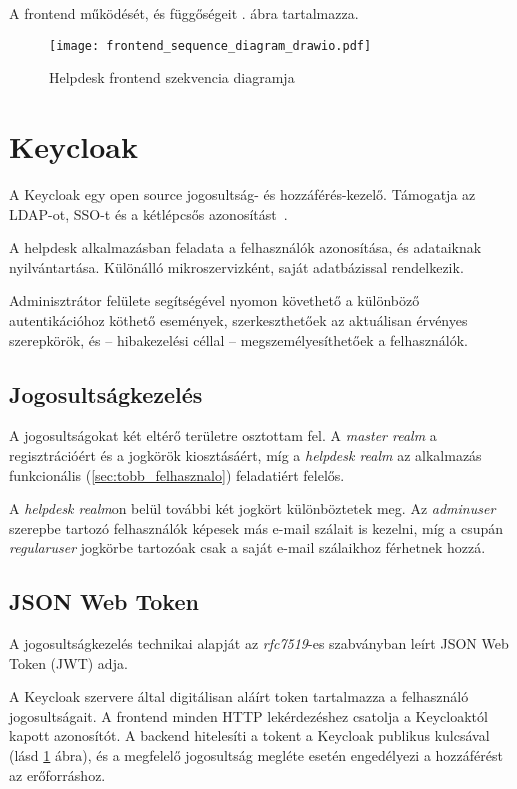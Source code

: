 A frontend működését, és függőségeit . ábra tartalmazza.

\begin{figure}[hbp] 
	\centering
	\texttt{[image: frontend\_sequence\_diagram\_drawio.pdf]}
	\caption{Helpdesk frontend szekvencia diagramja}
	\label{fig:frontend_sequence_diagram}
\end{figure}


\section{Keycloak}\label{sec:keycloak}
A Keycloak egy open source jogosultság- és hozzáférés-kezelő. Támogatja az LDAP-ot, SSO-t és a kétlépcsős azonosítást~\cite{Keycloak_website}. 

A helpdesk alkalmazásban feladata a felhasználók azonosítása, és adataiknak nyilvántartása. Különálló mikroszervizként, saját adatbázissal rendelkezik.

Adminisztrátor felülete segítségével nyomon követhető a különböző autentikációhoz köthető események, szerkeszthetőek az aktuálisan érvényes szerepkörök, és --  hibakezelési céllal --   megszemélyesíthetőek a felhasználók.


\subsection{Jogosultságkezelés}
A jogosultságokat két eltérő területre osztottam fel. A \textit{master realm} a regisztrációért és a jogkörök kiosztásáért, míg a \textit{helpdesk realm} az alkalmazás funkcionális (\ref{sec:tobb_felhasznalo}) feladatiért felelős.

A \textit{helpdesk realm}on belül további két jogkört különböztetek meg. Az \textit{admin\textunderscore user} szerepbe tartozó felhasználók képesek más e-mail szálait is kezelni, míg a csupán \textit{regular\textunderscore user} jogkörbe tartozóak csak a saját e-mail szálaikhoz férhetnek hozzá.


\subsection{JSON Web Token}\label{sec:JWT}
A jogosultságkezelés technikai alapját az \textit{rfc7519}-es szabványban \cite{rfc7519_JSON_Web_Token} leírt JSON Web Token (JWT) adja. 

A Keycloak szervere által digitálisan aláírt token tartalmazza a felhasználó jogosultságait. A frontend minden HTTP lekérdezéshez csatolja a Keycloaktól kapott azonosítót. A backend hitelesíti a tokent a Keycloak publikus kulcsával (lásd \ref{fig:frontend_sequence_diagram} ábra), és a megfelelő jogosultság megléte esetén engedélyezi a hozzáférést az erőforráshoz.


